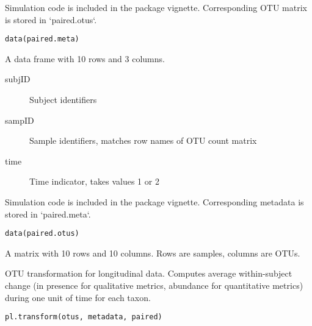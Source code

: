 \documentclass[a4paper]{book}
\begin{document}
%
\begin{Description}\relax
Simulation code is included in the package vignette. 
Corresponding OTU matrix is stored in `paired.otus`.
\end{Description}
%
\begin{Usage}
\begin{verbatim}
data(paired.meta)
\end{verbatim}
\end{Usage}
%
\begin{Format}
A data frame with 10 rows and 3 columns. 
\begin{description}

\item[subjID] Subject identifiers
\item[sampID] Sample identifiers, matches row names of OTU count matrix
\item[time] Time indicator, takes values 1 or 2

\end{description}
\end{Format}
%
\begin{Description}\relax
Simulation code is included in the package vignette. 
Corresponding metadata is stored in `paired.meta`.
\end{Description}
%
\begin{Usage}
\begin{verbatim}
data(paired.otus)
\end{verbatim}
\end{Usage}
%
\begin{Format}
A matrix with 10 rows and 10 columns. Rows are samples, columns are OTUs.
\end{Format}
%
\begin{Description}\relax
OTU transformation for longitudinal data. Computes average within-subject change 
(in presence for qualitative metrics, abundance for quantitative metrics) 
during one unit of time for each taxon.
\end{Description}
%
\begin{Usage}
\begin{verbatim}
pl.transform(otus, metadata, paired)
\end{verbatim}
\end{Usage}
%
\end{document}
